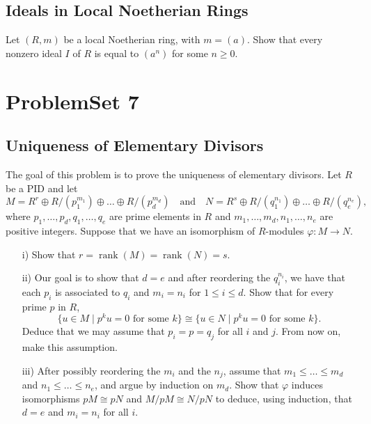 \documentclass[lang=cn,11pt]{template}
\begin{document}
\section{Ideals in Local Noetherian Rings}
Let \( (R, m) \) be a local Noetherian ring, with \( m = (a) \). Show that every nonzero ideal \( I \) of \( R \) is equal to \( (a^n) \) for some \( n \geq 0 \).







\chapter{ProblemSet 7}

\section{Uniqueness of Elementary Divisors}
The goal of this problem is to prove the uniqueness of elementary divisors. Let \( R \) be a PID and let
\[
M = R^r \oplus R/(p_1^{m_1}) \oplus \dots \oplus R/(p_d^{m_d}) \quad \text{and} \quad N = R^s \oplus R/(q_1^{n_1}) \oplus \dots \oplus R/(q_e^{n_e}),
\]
where \( p_1, \dots, p_d, q_1, \dots, q_e \) are prime elements in \( R \) and \( m_1, \dots, m_d, n_1, \dots, n_e \) are positive integers. Suppose that we have an isomorphism of \( R \)-modules \( \varphi : M \rightarrow N \).
\begin{itemize}
    \item[i)] Show that \( r = \operatorname{rank}(M) = \operatorname{rank}(N) = s \).
    \item[ii)] Our goal is to show that \( d = e \) and after reordering the \( q_i^{n_i} \), we have that each \( p_i \) is associated to \( q_i \) and \( m_i = n_i \) for \( 1 \leq i \leq d \). Show that for every prime \( p \) in \( R \),
    \[
    \{u \in M \mid p^k u = 0 \text{ for some } k\} \cong \{u \in N \mid p^k u = 0 \text{ for some } k\}.
    \]
    Deduce that we may assume that \( p_i = p = q_j \) for all \( i \) and \( j \). From now on, make this assumption.
    \item[iii)] After possibly reordering the \( m_i \) and the \( n_j \), assume that \( m_1 \leq \dots \leq m_d \) and \( n_1 \leq \dots \leq n_e \), and argue by induction on \( m_d \). Show that \( \varphi \) induces isomorphisms \( pM \cong pN \) and \( M/pM \cong N/pN \) to deduce, using induction, that \( d = e \) and \( m_i = n_i \) for all \( i \).
\end{itemize}
\end{document}
